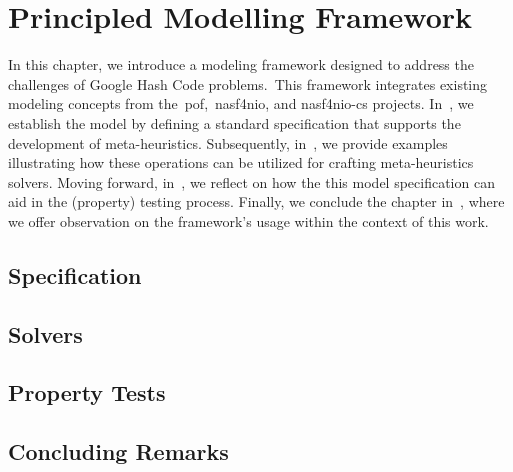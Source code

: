 \chapter{Principled Modelling Framework}
\label{ch:principled-modelling-framework}


In this chapter, we introduce a modeling framework designed to address the
challenges of Google Hash Code problems.~This framework integrates existing
modeling concepts from the~\acrshort{pof},~\acrshort{nasf4nio}, and
\acrshort{nasf4nio-cs} projects. In~, we establish the
model by defining a standard specification that supports the development of
meta-heuristics. Subsequently, in~, we provide examples
illustrating how these operations can be utilized for crafting meta-heuristics
solvers. Moving forward, in~, we reflect on how the this model
specification can aid in the (property) testing process. Finally, we conclude
the chapter in~, where we offer observation on
the framework's usage within the context of this work.

\section{Specification}
\label{sec:specification}


\section{Solvers}
\label{sec:solver}


\section{Property Tests}
\label{sec:tests}


\section{Concluding Remarks}
\label{sec:pmf-concluding-remarks}
